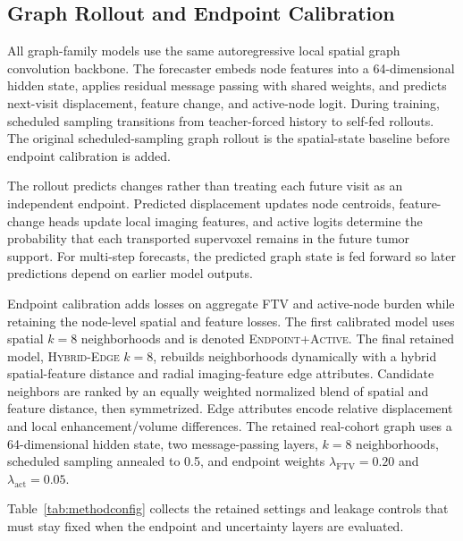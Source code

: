 \documentclass[journal,twoside,print]{ieeecolor}
\newcommand{\ftv}{\mathrm{FTV}}
\newcommand{\calibrationtag}{\textsc{Endpoint+Active}}
\newcommand{\modeltag}{\textsc{Hybrid-Edge} $k=8$}
\begin{document}
\subsection{Graph Rollout and Endpoint Calibration}

All graph-family models use the same autoregressive local spatial graph
convolution backbone. The forecaster embeds node features into a
64-dimensional hidden state, applies residual message passing with shared
weights, and predicts next-visit displacement, feature change, and active-node
logit. During training, scheduled sampling transitions from teacher-forced
history to self-fed rollouts. The original scheduled-sampling graph rollout is
the spatial-state baseline before endpoint calibration is added.

The rollout predicts changes rather than treating each future visit as an
independent endpoint. Predicted displacement updates node centroids,
feature-change heads update local imaging features, and active logits determine
the probability that each transported supervoxel remains in the future tumor
support. For multi-step forecasts, the predicted graph state is fed forward so
later predictions depend on earlier model outputs.

Endpoint calibration adds losses on aggregate FTV and active-node burden while
retaining the node-level spatial and feature losses. The first calibrated model
uses spatial $k=8$ neighborhoods and is denoted \calibrationtag. The final
retained model, \modeltag, rebuilds neighborhoods dynamically with a hybrid
spatial-feature distance and radial imaging-feature edge attributes. Candidate
neighbors are ranked by an equally weighted normalized blend of spatial and
feature distance, then symmetrized. Edge attributes encode relative
displacement and local enhancement/volume differences. The retained real-cohort
graph uses a 64-dimensional hidden state, two message-passing layers, $k=8$
neighborhoods, scheduled sampling annealed to 0.5, and endpoint weights
$\lambda_{\ftv}=0.20$ and $\lambda_{\mathrm{act}}=0.05$.

Table~\ref{tab:methodconfig} collects the retained settings and leakage
controls that must stay fixed when the endpoint and uncertainty layers are
evaluated.
\end{document}

